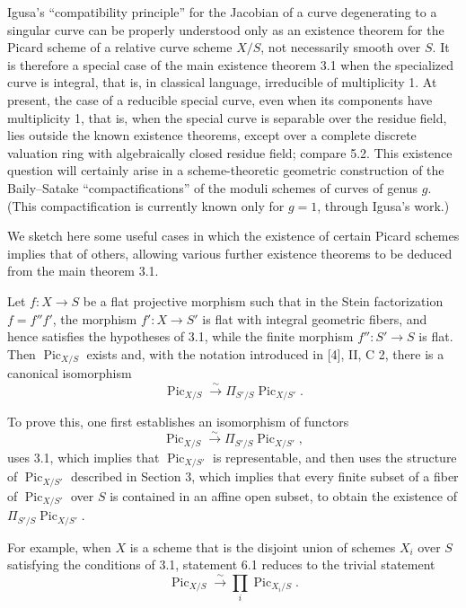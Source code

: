  Igusa's “compatibility principle” for the Jacobian of a
curve degenerating to a singular curve can be properly understood only as an
existence theorem for the Picard scheme of a relative curve scheme $X/S$, not
necessarily smooth over $S$. It is therefore a special case of the main
existence theorem 3.1 when the specialized curve is integral, that is, in
classical language, irreducible of multiplicity 1. At present, the case of a
reducible special curve, even when its components have multiplicity 1, that
is, when the special curve is separable over the residue field, lies outside
the known existence theorems, except over a complete discrete valuation ring
with algebraically closed residue field; compare 5.2. This existence question
will certainly arise in a scheme-theoretic geometric construction of the
Baily--Satake “compactifications” of the moduli schemes of curves of genus
$g$. (This compactification is currently known only for $g=1$, through
Igusa's work.)


We sketch here some useful cases in which the existence of certain Picard
schemes implies that of others, allowing various further existence theorems
to be deduced from the main theorem 3.1.

 Let $f:X\longrightarrow S$ be a flat projective
morphism such that in the Stein factorization $f=f''f'$, the morphism
$f':X\longrightarrow S'$ is flat with integral geometric fibers, and hence
satisfies the hypotheses of 3.1, while the finite morphism
$f'':S'\longrightarrow S$ is flat. Then $\operatorname{Pic}_{X/S}$ exists and,
with the notation introduced in [4], II, C 2, there is a canonical isomorphism
\[
\operatorname{Pic}_{X/S}\xrightarrow{\sim}
\Pi_{S'/S}\operatorname{Pic}_{X/S'}.
\]

To prove this, one first establishes an isomorphism of functors
\[
\operatorname{Pic}_{X/S}\xrightarrow{\sim}
\Pi_{S'/S}\operatorname{Pic}_{X/S'},
\]
uses 3.1, which implies that $\operatorname{Pic}_{X/S'}$ is representable, and
then uses the structure of $\operatorname{Pic}_{X/S'}$ described in Section 3,
which implies that every finite subset of a fiber of
$\operatorname{Pic}_{X/S'}$ over $S$ is contained in an affine open subset, to
obtain the existence of $\Pi_{S'/S}\operatorname{Pic}_{X/S'}$.

For example, when $X$ is a scheme that is the disjoint union of schemes $X_i$
over $S$ satisfying the conditions of 3.1, statement 6.1 reduces to the trivial
statement
\[
\operatorname{Pic}_{X/S}\xrightarrow{\sim}
\prod_i\operatorname{Pic}_{X_i/S}.
\]

